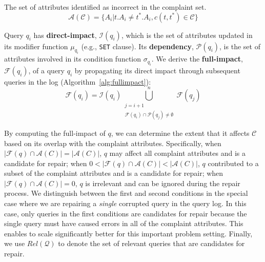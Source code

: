 \begin{definition} 
	The set of attributes identified as incorrect in the complaint set.
	\[\mathcal{A}(\mathcal{C}) = \{A_i | t.A_i \neq t^*.A_i, c(t,t^*) \in \mathcal{C}\}\]
\end{definition} 


\begin{definition} \label{eq:dependency}
    Query $q_i$ has \textbf{direct-impact}, $\mathcal{I}(q_i)$, which is
    the set of attributes updated in its modifier function $\mu_{q_i}$
    (e.g., \texttt{SET} clause). Its \textbf{dependency},
    $\mathcal{P}(q_i)$, is the set of attributes involved in its
    condition function $\sigma_{q_i}$.
    We derive the \textbf{full-impact}, $\mathcal{F}(q_i)$, of a query $q_i$ by propagating its direct impact through subsequent queries in the log (Algorithm~\ref{alg:fullimpact}):
    \[
    \mathcal{F}(q_i)=\mathcal{I}(q_i)\bigcup_{\substack{j=i+1\\ \mathcal{F}(q_{i})\cap \mathcal{P}(q_j) \neq \emptyset}}^n \mathcal{F}(q_j)
    \]
\end{definition}






By computing the full-impact of $q$, we can determine the extent that it affects $\mathcal{C}$
based on its overlap with the complaint attributes.
Specifically, 
when $|\mathcal{F}(q) \cap \mathcal{A}(C)|=|\mathcal{A}(C)|$, $q$ may affect all complaint attributes and is a candidate for repair; 
when $0 < |\mathcal{F}(q) \cap \mathcal{A}(C)| < |\mathcal{A}(C)|$, 
$q$ contributed to a subset of the complaint attributes and is a candidate for repair;
when $|\mathcal{F}(q) \cap \mathcal{A}(C)|=0$, $q$ is irrelevant 
and can be ignored during the repair process.
We distinguish between the first and second conditions in the special case where we are repairing a \emph{single} 
corrupted query in the query log.  In this case, only queries in the first conditions are candidates for repair because 
the single query must have caused errors in all of the complaint attributes.  This enables \sys to scale significantly better
for this important problem setting. 
Finally, we use $Rel\mathcal{(Q)}$ to denote the set of relevant
queries that are candidates for repair.


